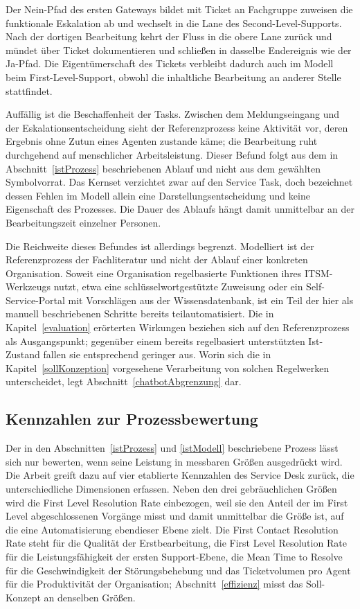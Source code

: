 Der Nein-Pfad des ersten Gateways bildet mit \glqq Ticket an Fachgruppe zuweisen\grqq{} die funktionale Eskalation ab und wechselt in die Lane des Second-Level-Supports. Nach der dortigen Bearbeitung kehrt der Fluss in die obere Lane zur\"uck und m\"undet \"uber \glqq Ticket dokumentieren und schlie{\ss}en\grqq{} in dasselbe Endereignis wie der Ja-Pfad. Die Eigent\"umerschaft des Tickets verbleibt dadurch auch im Modell beim First-Level-Support, obwohl die inhaltliche Bearbeitung an anderer Stelle stattfindet.

Auff\"allig ist die Beschaffenheit der Tasks. Zwischen dem Meldungseingang und der Eskalationsentscheidung sieht der Referenzprozess keine Aktivit\"at vor, deren Ergebnis ohne Zutun eines Agenten zustande k\"ame; die Bearbeitung ruht durchgehend auf menschlicher Arbeitsleistung. Dieser Befund folgt aus dem in Abschnitt~\ref{istProzess} beschriebenen Ablauf und nicht aus dem gew\"ahlten Symbolvorrat. Das Kernset verzichtet zwar auf den Service Task, doch bezeichnet dessen Fehlen im Modell allein eine Darstellungsentscheidung und keine Eigenschaft des Prozesses. Die Dauer des Ablaufs h\"angt damit unmittelbar an der Bearbeitungszeit einzelner Personen.

Die Reichweite dieses Befundes ist allerdings begrenzt. Modelliert ist der Referenzprozess der Fachliteratur und nicht der Ablauf einer konkreten Organisation. Soweit eine Organisation regelbasierte Funktionen ihres ITSM-Werkzeugs nutzt, etwa eine schl\"usselwortgest\"utzte Zuweisung oder ein Self-Service-Portal mit Vorschl\"agen aus der Wissensdatenbank, ist ein Teil der hier als manuell beschriebenen Schritte bereits teilautomatisiert. Die in Kapitel~\ref{evaluation} er\"orterten Wirkungen beziehen sich auf den Referenzprozess als Ausgangspunkt; gegen\"uber einem bereits regelbasiert unterst\"utzten Ist-Zustand fallen sie entsprechend geringer aus. Worin sich die in Kapitel~\ref{sollKonzeption} vorgesehene Verarbeitung von solchen Regelwerken unterscheidet, legt Abschnitt~\ref{chatbotAbgrenzung} dar.

\subsection{Kennzahlen zur Prozessbewertung}
\label{kennzahlen}

Der in den Abschnitten~\ref{istProzess} und \ref{istModell} beschriebene Prozess l\"asst sich nur bewerten, wenn seine Leistung in messbaren Gr\"o{\ss}en ausgedr\"uckt wird. Die Arbeit greift dazu auf vier etablierte Kennzahlen des Service Desk zur\"uck, die unterschiedliche Dimensionen erfassen. Neben den drei gebr\"auchlichen Gr\"o{\ss}en wird die First Level Resolution Rate einbezogen, weil sie den Anteil der im First Level abgeschlossenen Vorg\"ange misst und damit unmittelbar die Gr\"o{\ss}e ist, auf die eine Automatisierung ebendieser Ebene zielt. Die First Contact Resolution Rate steht f\"ur die Qualit\"at der Erstbearbeitung, die First Level Resolution Rate f\"ur die Leistungsf\"ahigkeit der ersten Support-Ebene, die Mean Time to Resolve f\"ur die Geschwindigkeit der St\"orungsbehebung und das Ticketvolumen pro Agent f\"ur die Produktivit\"at der Organisation; Abschnitt~\ref{effizienz} misst das Soll-Konzept an denselben Gr\"o{\ss}en.

